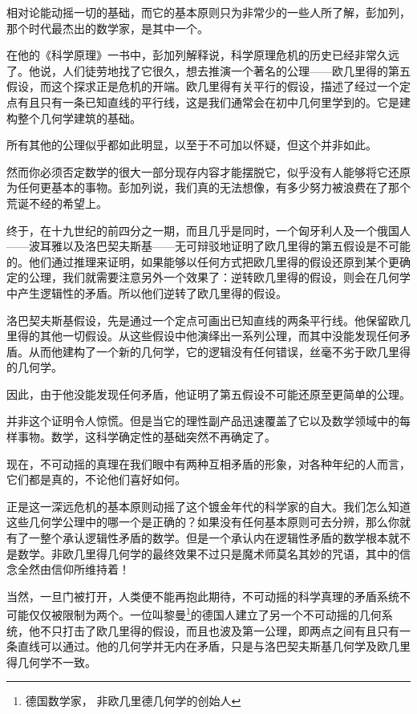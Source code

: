\documentclass[UTF8]{article}
\begin{document}
\par 相对论能动摇一切的基础，而它的基本原则只为非常少的一些人所了解，彭加列，那个时代最杰出的数学家，是其中一个。
\par 在他的《科学原理》一书中，彭加列解释说，科学原理危机的历史已经非常久远了。他说，人们徒劳地找了它很久，想去推演一个著名的公理——欧几里得的第五假设，而这个探求正是危机的开端。欧几里得有关平行的假设，描述了经过一个定点有且只有一条已知直线的平行线，这是我们通常会在初中几何里学到的。它是建构整个几何学建筑的基础。
\par 所有其他的公理似乎都如此明显，以至于不可加以怀疑，但这个并非如此。
\par 然而你必须否定数学的很大一部分现存内容才能摆脱它，似乎没有人能够将它还原为任何更基本的事物。彭加列说，我们真的无法想像，有多少努力被浪费在了那个荒诞不经的希望上。
\par 终于，在十九世纪的前四分之一期，而且几乎是同时，一个匈牙利人及一个俄国人——波耳雅以及洛巴契夫斯基——无可辩驳地证明了欧几里得的第五假设是不可能的。他们通过推理来证明，如果能够以任何方式把欧几里得的假设还原到某个更确定的公理，我们就需要注意另外一个效果了：逆转欧几里得的假设，则会在几何学中产生逻辑性的矛盾。所以他们逆转了欧几里得的假设。
\par 洛巴契夫斯基假设，先是通过一个定点可画出已知直线的两条平行线。他保留欧几里得的其他一切假设。从这些假设中他演绎出一系列公理，而其中没能发现任何矛盾。从而他建构了一个新的几何学，它的逻辑没有任何错误，丝毫不劣于欧几里得的几何学。
\par 因此，由于他没能发现任何矛盾，他证明了第五假设不可能还原至更简单的公理。
\par 并非这个证明令人惊慌。但是当它的理性副产品迅速覆盖了它以及数学领域中的每样事物。数学，这科学确定性的基础突然不再确定了。
\par 现在，不可动摇的真理在我们眼中有两种互相矛盾的形象，对各种年纪的人而言，它们都是真的，不论他们喜好如何。
\par 正是这一深远危机的基本原则动摇了这个镀金年代的科学家的自大。我们怎么知道这些几何学公理中的哪一个是正确的？如果没有任何基本原则可去分辨，那么你就有了一整个承认逻辑性矛盾的数学。但是一个承认内在逻辑性矛盾的数学根本就不是数学。非欧几里得几何学的最终效果不过只是魔术师莫名其妙的咒语，其中的信念全然由信仰所维持着！
\par 当然，一旦门被打开，人类便不能再抱此期待，不可动摇的科学真理的矛盾系统不可能仅仅被限制为两个。一位叫黎曼\footnote{德国数学家， 非欧几里德几何学的创始人}的德国人建立了另一个不可动摇的几何系统，他不只打击了欧几里得的假设，而且也波及第一公理，即两点之间有且只有一条直线可以通过。他的几何学并无内在矛盾，只是与洛巴契夫斯基几何学及欧几里得几何学不一致。
\end{document}
